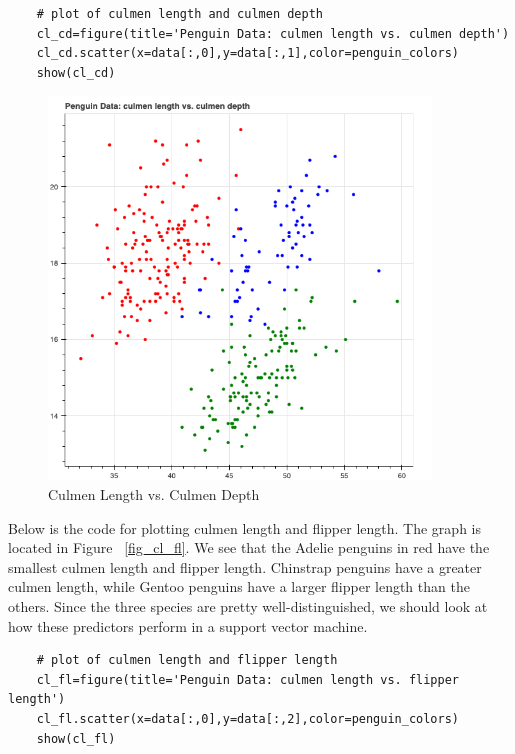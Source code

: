 \documentclass[12pt]{article}
\begin{document}
\begin{verbatim}
    # plot of culmen length and culmen depth
    cl_cd=figure(title='Penguin Data: culmen length vs. culmen depth')
    cl_cd.scatter(x=data[:,0],y=data[:,1],color=penguin_colors)
    show(cl_cd)
\end{verbatim}

\begin{figure}[H]
    \centering
    \includegraphics[width=4in]{Figures/penguins/cl_cd.png}
    \caption{Culmen Length vs. Culmen Depth}
    \label{fig_cl_cd}
\end{figure}

Below is the code for plotting culmen length and flipper length. The graph is located in Figure ~\ref{fig_cl_fl}. We see that the Adelie penguins in red have the smallest culmen length and flipper length. Chinstrap penguins have a greater culmen length, while Gentoo penguins have a larger flipper length than the others. Since the three species are pretty well-distinguished, we should look at how these predictors perform in a support vector machine.

\begin{verbatim}
    # plot of culmen length and flipper length
    cl_fl=figure(title='Penguin Data: culmen length vs. flipper length')
    cl_fl.scatter(x=data[:,0],y=data[:,2],color=penguin_colors)
    show(cl_fl)
\end{verbatim}
\end{document}
